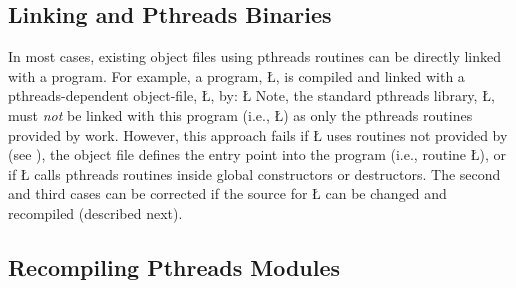 \documentclass[openright,twoside]{report}
\begin{document}
\subsection{\texorpdfstring{Linking \uC and Pthreads Binaries}{Linking uC++ and Pthreads Binaries}}

In most cases, existing object files using pthreads routines can be directly linked with a \uC program.
For example, a \uC program, \LGinlinetrue\LGbegin\lgrinde\L{}\endlgrinde\LGend{}, is compiled and linked with a pthreads-dependent object-file, \LGinlinetrue\LGbegin\lgrinde\L{}\endlgrinde\LGend{}, by:
\LGinlinefalse\LGbegin\lgrinde
\L{}
\endlgrinde\LGend
Note, the standard pthreads library, \LGinlinetrue\LGbegin\lgrinde\L{}\endlgrinde\LGend{}, must \emph{not} be linked with this program (i.e., \LGinlinetrue\LGbegin\lgrinde\L{}\endlgrinde\LGend{}) as only the pthreads routines provided by \uC work.
However, this approach fails if \LGinlinetrue\LGbegin\lgrinde\L{}\endlgrinde\LGend{} uses routines not provided by \uC (see ), the object file defines the entry point into the program (i.e., routine \LGinlinetrue\LGbegin\lgrinde\L{}\endlgrinde\LGend{}), or if \LGinlinetrue\LGbegin\lgrinde\L{}\endlgrinde\LGend{} calls pthreads routines inside global constructors or destructors. 
The second and third cases can be corrected if the source for \LGinlinetrue\LGbegin\lgrinde\L{}\endlgrinde\LGend{} can be changed and recompiled (described next).


\subsection{Recompiling Pthreads Modules}
\end{document}
